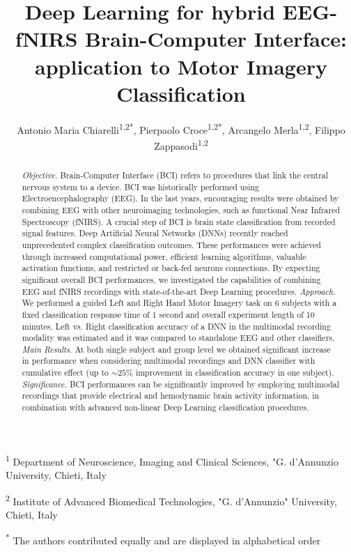 \documentclass[12pt]{iopart}
\begin{document}
\title[DNN for EEG-fNIRS BCI]{Deep Learning for  hybrid EEG-fNIRS Brain-Computer Interface: application to Motor Imagery Classification}

\author{Antonio Maria Chiarelli\textsuperscript{1,2*}, Pierpaolo Croce\textsuperscript{1,2*}, Arcangelo Merla\textsuperscript{1,2}, Filippo Zappasodi\textsuperscript{1,2}}

\vspace{10pt}
\begin{indented}
\item[] \textsuperscript{1} Department of Neuroscience, Imaging and Clinical Sciences, "G. d'Annunzio University, Chieti, Italy
\item[] \textsuperscript{2} Institute of Advanced Biomedical Technologies, "G. d'Annunzio" University, Chieti, Italy
\item[] \textsuperscript{*} The authors contributed equally and are displayed in alphabetical order
\end{indented}

\begin{abstract}
	\textit{Objective.} Brain-Computer Interface (BCI) refers to procedures that link the central nervous system to a device.  BCI was historically performed using Electroencephalography (EEG). In the last years, encouraging results were obtained by combining EEG with other neuroimaging technologies, such as functional Near Infrared Spectroscopy (fNIRS). A crucial step of BCI is brain state classification from recorded signal features. Deep Artificial Neural Networks (DNNs) recently reached unprecedented complex classification outcomes. These performances were achieved through increased computational power, efficient learning algorithms, valuable activation functions, and restricted or back-fed neurons connections. By expecting significant overall BCI performances, we investigated the capabilities of combining EEG and fNIRS recordings with state-of-the-art Deep Learning procedures.
	\textit{Approach.} We performed a guided Left and Right Hand Motor Imagery task on 6 subjects with a fixed classification response time of 1 second and overall experiment length of 10 minutes. Left vs. Right classification accuracy of a DNN in the multimodal recording modality was estimated and it was compared to standalone EEG and other classifiers.
	\textit{Main Results.} At both single subject and group level we obtained significant increase in performance when considering multimodal recordings and DNN classifier with cumulative effect (up to $\sim25\%$ improvement in classification accuracy in one subject).
	\textit{Significance.} BCI performances can be significantly improved by employing multimodal recordings that provide electrical and hemodynamic brain activity information, in combination with advanced non-linear Deep Learning classification procedures.
\end{abstract}
\end{document}
